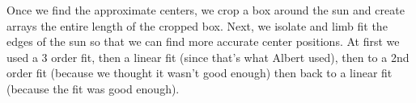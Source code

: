 \documentclass[10pt]{scrartcl}
\begin{document}

\begin{figure}[!ht]
\end{figure}

Once we find the approximate centers, we crop a box around the sun and create arrays the entire length of the cropped box. Next, we isolate and limb fit the edges of the sun so that we can find more accurate center positions. At first we used a 3 order fit, then a linear fit (since that's what Albert used), then to a 2nd order fit (because we thought it wasn't good enough) then back to a linear fit (because the fit was good enough). 
\end{document}
